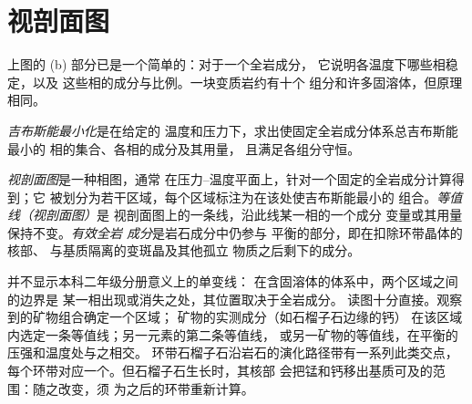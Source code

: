 \begin{omfigure}
\par{}\label{fig:b3:petrological-thermodynamics:solvus}
\end{omfigure}

\section{视剖面图}\label{sec:b3:petrological-thermodynamics:pseudosections}

上图的 (b) 部分已是一个简单的：对于一个全岩成分，
它说明各温度下哪些相稳定，以及
这些相的成分与比例。一块变质岩约有十个
组分和许多固溶体，但原理相同。

\begin{definition}[吉布斯能最小化]\label{def:b3:petrological-thermodynamics:minimisation}
\emph{吉布斯能最小化}是在给定的
温度和压力下，求出使固定全岩成分体系总吉布斯能最小的
相的集合、各相的成分及其用量，
且满足各组分守恒。
\end{definition}

\begin{definition}\label{def:b3:petrological-thermodynamics:pseudosection}
\emph{视剖面图}是一种相图，通常
在压力–温度平面上，针对一个固定的全岩成分计算得到；它
被划分为若干区域，每个区域标注为在该处使吉布斯能最小的
组合。\emph{等值线（视剖面图）}是
视剖面图上的一条线，沿此线某一相的一个成分
变量或其用量保持不变。\emph{有效全岩
成分}是岩石成分中仍参与
平衡的部分，即在扣除环带晶体的核部、
与基质隔离的变斑晶及其他孤立
物质之后剩下的成分。
\end{definition}

并不显示本科二年级分册意义上的单变线：
在含固溶体的体系中，两个区域之间的边界是
某一相出现或消失之处，其位置取决于全岩成分。
读图十分直接。观察到的矿物组合确定一个区域；
矿物的实测成分（如石榴子石边缘的钙）
在该区域内选定一条等值线；另一元素的第二条等值线，
或另一矿物的等值线，在平衡的压强和温度处与之相交。
环带石榴子石沿岩石的演化路径带有一系列此类交点，
每个环带对应一个。但石榴子石生长时，其核部
会把锰和钙移出基质可及的范围：随之改变，须
为之后的环带重新计算。

